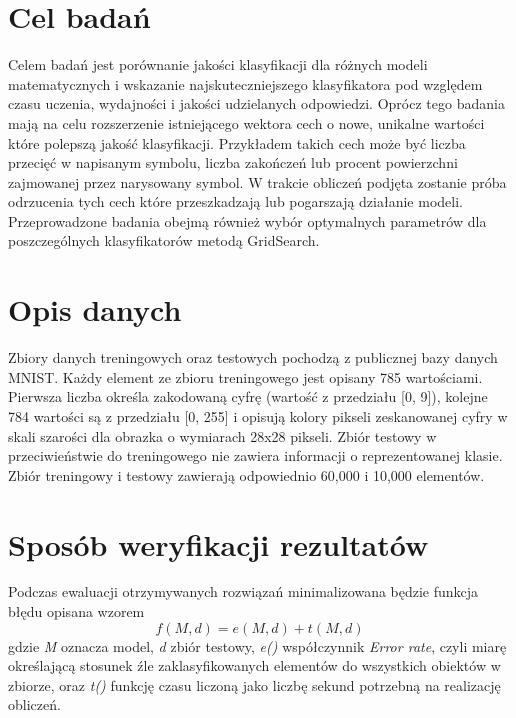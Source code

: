 \documentclass{article}
\begin{document}
\section{Cel badań}

Celem badań jest porównanie jakości klasyfikacji dla różnych modeli matematycznych i wskazanie najskuteczniejszego klasyfikatora pod względem czasu uczenia, wydajności i jakości udzielanych odpowiedzi. Oprócz tego badania mają na celu rozszerzenie istniejącego wektora cech o nowe, unikalne wartości które polepszą jakość klasyfikacji. Przykładem takich cech może być liczba przecięć w napisanym symbolu, liczba zakończeń lub procent powierzchni zajmowanej przez narysowany symbol. W trakcie obliczeń podjęta zostanie próba odrzucenia tych cech które przeszkadzają lub pogarszają działanie modeli. Przeprowadzone badania obejmą również wybór optymalnych parametrów dla poszczególnych klasyfikatorów metodą GridSearch\cite{gridsearch}. \\


\section{Opis danych}

Zbiory danych treningowych oraz testowych pochodzą z publicznej bazy danych MNIST\cite{mnist_database}. Każdy element ze zbioru treningowego jest opisany 785 wartościami. Pierwsza liczba określa zakodowaną cyfrę (wartość z przedziału [0, 9]), kolejne 784 wartości są z przedziału [0, 255] i opisują kolory pikseli zeskanowanej cyfry w skali szarości dla obrazka o wymiarach 28x28 pikseli. Zbiór testowy w przeciwieństwie do treningowego nie zawiera informacji o reprezentowanej klasie. Zbiór treningowy i testowy zawierają odpowiednio 60,000 i 10,000 elementów. \\


\section{Sposób weryfikacji rezultatów}

Podczas ewaluacji otrzymywanych rozwiązań minimalizowana będzie funkcja błędu opisana wzorem \[ f(M, d) = e(M, d) + t(M, d) \] gdzie \textit{M} oznacza model, \textit{d} zbiór testowy, \textit{e()} współczynnik \textit{Error rate}, czyli miarę określającą stosunek źle zaklasyfikowanych elementów do wszystkich obiektów w zbiorze, oraz \textit{t()} funkcję czasu liczoną jako liczbę sekund potrzebną na realizację obliczeń.
\end{document}
